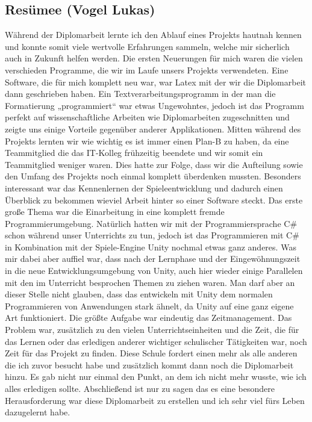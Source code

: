 \subsection{Resümee (Vogel Lukas)}
Während der Diplomarbeit lernte ich den Ablauf eines Projekts hautnah kennen und konnte somit viele wertvolle Erfahrungen sammeln, welche mir sicherlich auch in Zukunft helfen werden.
Die ersten Neuerungen für mich waren die vielen verschieden Programme, die wir im Laufe unsers Projekts verwendeten. Eine Software, die für mich komplett neu war, war Latex mit der wir die Diplomarbeit dann geschrieben haben. Ein Textverarbeitungsprogramm in der man die Formatierung „programmiert“ war etwas Ungewohntes, jedoch ist das Programm perfekt auf wissenschaftliche Arbeiten wie Diplomarbeiten zugeschnitten und zeigte uns einige Vorteile gegenüber anderer Applikationen.
Mitten während des Projekts lernten wir wie wichtig es ist immer einen Plan-B zu haben, da eine Teammitglied die das IT-Kolleg frühzeitig beendete und wir somit ein Teammitglied weniger waren. Dies hatte zur Folge, dass wir die Aufteilung sowie den Umfang des Projekts noch einmal komplett überdenken mussten.
Besonders interessant war das Kennenlernen der Spieleentwicklung und dadurch einen Überblick zu bekommen wieviel Arbeit hinter so einer Software steckt. Das erste große Thema war die Einarbeitung in eine komplett fremde Programmierumgebung. Natürlich hatten wir mit der Programmiersprache C\# schon während unser Unterrichts zu tun, jedoch ist das Programmieren mit C\# in Kombination mit der Spiele-Engine Unity nochmal etwas ganz anderes. Was mir dabei aber auffiel war, dass nach der Lernphase und der Eingewöhnungszeit in die neue Entwicklungsumgebung von Unity, auch hier wieder einige Parallelen mit den im Unterricht besprochen Themen zu ziehen waren. Man darf aber an dieser Stelle nicht glauben, dass das entwickeln mit Unity dem normalen Programmieren von Anwendungen stark ähnelt, da Unity auf eine ganz eigene Art funktioniert.
Die größte Aufgabe war eindeutig das Zeitmanagement. Das Problem war, zusätzlich zu den vielen Unterrichtseinheiten und die Zeit, die für das Lernen oder das erledigen anderer wichtiger schulischer Tätigkeiten war, noch Zeit für das Projekt zu finden. Diese Schule fordert einen mehr als alle anderen die ich zuvor besucht habe und zusätzlich kommt dann noch die Diplomarbeit hinzu. Es gab nicht nur einmal den Punkt, an dem ich nicht mehr wusste, wie ich alles erledigen sollte. Abschließend ist nur zu sagen das es eine besondere Herausforderung war diese Diplomarbeit zu erstellen und ich sehr viel fürs Leben dazugelernt habe.
